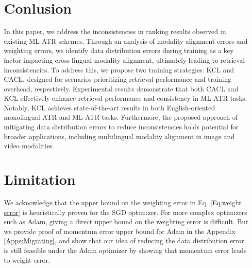 \section{Conlusion}
In this paper, we address the inconsistencies in ranking results observed in existing ML-ATR schemes. Through an analysis of modality alignment errors and weighting errors, we identify data distribution errors during training as a key factor impacting cross-lingual modality alignment, ultimately leading to retrieval inconsistencies. To address this, we propose two training strategies: KCL and CACL, designed for scenarios prioritizing retrieval performance and training overhead, respectively. Experimental results demonstrate that both CACL and KCL effectively enhance retrieval performance and consistency in ML-ATR tasks. Notably, KCL achieves state-of-the-art results in both English-oriented monolingual ATR and ML-ATR tasks. Furthermore, the proposed approach of mitigating data distribution errors to reduce inconsistencies holds potential for broader applications, including multilingual modality alignment in image and video modalities.

\section*{Limitation}
We acknowledge that the upper bound on the weighting error in Eq. \eqref{Eq:weight error} is heuristically proven for the SGD optimizer. For more complex optimizers such as Adam, giving a direct upper bound on the weighting error is difficult. But we provide proof of momentum error upper bound for Adam in the Appendix \ref{Appe:Migrating}, and show that our idea of reducing the data distribution error is still feasible under the Adam optimizer by showing that momentum error leads to weight error.